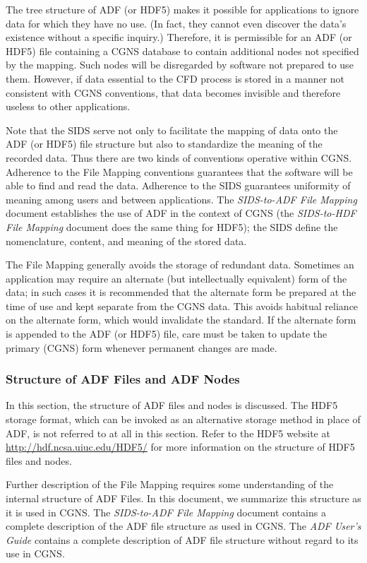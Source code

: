 The tree structure of ADF (or HDF5) makes it possible for applications
to ignore data for which they have no use.
(In fact, they cannot even discover the data's existence without a
specific inquiry.)
Therefore, it is permissible for an ADF (or HDF5) file containing a CGNS
database to contain additional nodes not specified by the mapping.
Such nodes will be disregarded by software not prepared to use them.
However, if data essential to the CFD process is stored in a manner
not consistent with CGNS conventions, that data becomes invisible and
therefore useless to other applications.

Note that the SIDS serve not only to facilitate the mapping of data onto
the ADF (or HDF5) file structure but also to standardize the meaning of
the recorded data.
Thus there are two kinds of conventions operative within CGNS.
Adherence to the File Mapping conventions guarantees that the software
will be able to find and read the data.
Adherence to the SIDS guarantees uniformity of meaning among users and
between applications.
The \textit{SIDS-to-ADF File Mapping} document establishes the
use of ADF in the context of CGNS (the \textit{SIDS-to-HDF File
Mapping} document does the same thing for HDF5); the SIDS define the
nomenclature, content, and meaning of the stored data.

The File Mapping generally avoids the storage of redundant data.
Sometimes an application may require an alternate (but intellectually
equivalent) form of the data; in such cases it is recommended that the
alternate form be prepared at the time of use and kept separate from the
CGNS data.
This avoids habitual reliance on the alternate form, which would
invalidate the standard.
If the alternate form is appended to the ADF (or HDF5) file, care must
be taken to update the primary (CGNS) form whenever permanent changes
are made.

\subsubsection{Structure of ADF Files and ADF Nodes}

In this section, the structure of ADF files and nodes is discussed.
The HDF5 storage format, which can be invoked as an alternative storage
method in place of ADF, is not referred to at all in this section.
Refer to the HDF5 website at \url{http://hdf.ncsa.uiuc.edu/HDF5/} for
more information on the structure of HDF5 files and nodes.

Further description of the File Mapping requires some understanding of
the internal structure of ADF Files.
In this document, we summarize this structure as it is used in CGNS.
The \textit{SIDS-to-ADF File Mapping} document contains a complete
description of the ADF file structure as used in CGNS.
The \textit{ADF User's Guide} contains a complete description of ADF
file structure without regard to its use in CGNS.

